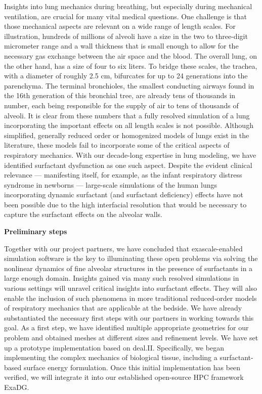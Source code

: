\documentclass[a4paper,12pt, numbers]{article}
\begin{document}
Insights into lung mechanics during breathing, but especially during mechanical ventilation, are crucial for many vital medical questions.
One challenge is that those mechanical aspects are relevant on a wide range of length scales.
For illustration, hundreds of millions of alveoli have a size in the two to three-digit micrometer range and a wall thickness that is small enough to allow for the necessary gas exchange between the air space and the blood.
The overall lung, on the other hand, has a size of four to six liters.
To bridge these scales, the trachea, with a diameter of roughly 2.5 cm, bifurcates for up to 24 generations into the parenchyma.
The terminal bronchioles, the smallest conducting airways found in the 16th generation of this bronchial tree, are already tens of thousands in number, each being responsible for the supply of air to tens of thousands of alveoli.
It is clear from these numbers that a fully resolved simulation of a lung incorporating the important effects on all length scales is not possible.
Although simplified, generally reduced order or homogenized models of lungs exist in the literature, these models fail to incorporate some of the critical aspects of respiratory mechanics.
With our decade-long expertise in lung modeling, we have identified surfactant dysfunction as one such aspect.
Despite the evident clinical relevance — manifesting itself, for example, as the infant respiratory distress syndrome in newborns — large-scale simulations of the human lungs incorporating dynamic surfactant (and surfactant deficiency) effects have not been possible due to the high interfacial resolution that would be necessary to capture the surfactant effects on the alveolar walls.

\noindent\textbf{Preliminary steps}

Together with our project partners, we have concluded that exascale-enabled simulation software is the key to illuminating these open problems via solving the nonlinear dynamics of fine alveolar structures in the presence of surfactants in a large enough domain.
Insights gained via many such resolved simulations in various settings will unravel critical insights into surfactant effects.
They will also enable the inclusion of such phenomena in more traditional reduced-order models of respiratory mechanics that are applicable at the bedside.
We have already substantiated the necessary first steps with our partners in working towards this goal.
As a first step, we have identified multiple appropriate geometries for our problem and obtained meshes at different sizes and refinement levels.
We have set up a prototype implementation based on deal.II.
Specifically, we began implementing the complex mechanics of biological tissue, including a surfactant-based surface energy formulation.
Once this initial implementation has been verified, we will integrate it into our established open-source HPC framework ExaDG.
\end{document}
